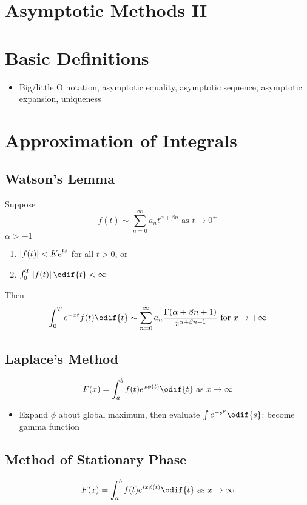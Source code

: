 


\section*{Asymptotic Methods \hfill II}

\section{Basic Definitions}
\begin{itemize}
    \item Big/little O notation, asymptotic equality, asymptotic sequence, asymptotic expansion, uniqueness
\end{itemize}
\section{Approximation of Integrals}
\subsection*{Watson's Lemma}
Suppose 
\[f(t) \sim \sum_{n=0}^\infty a_n t^{\alpha + \beta n} \text{ as } t \to 0^+\] 
$\alpha>-1$
\begin{enumerate}
    \item $\left| f(t) \right| < Ke^{bt}$ for all $t>0$, or
    \item $\int_0^T \abs{f(t)} \odif{t} < \infty $ 
\end{enumerate}
Then \[\int_0^T e^{-xt} f(t) \odif{t} \sim \sum_{n=0}^\infty a_n \frac{\Gamma(\alpha+\beta 
n+1)}{x^{\alpha + \beta n + 1}} \text{ for } x \to +\infty\]

\subsection*{Laplace's Method} 
\[F(x) = \int_a^b f(t)e^{x\phi(t)} \odif{t} \text{ as } x \to \infty\]
    
\begin{itemize}
    \item Expand $\phi$ about global maximum, then evaluate $\int e^{-s^p} \odif{s}$: become gamma function
\end{itemize}

\subsection*{Method of Stationary Phase}
\[F(x) = \int_a^b f(t)e^{ix\phi(t)} \odif{t} \text{ as } x \to \infty \]

